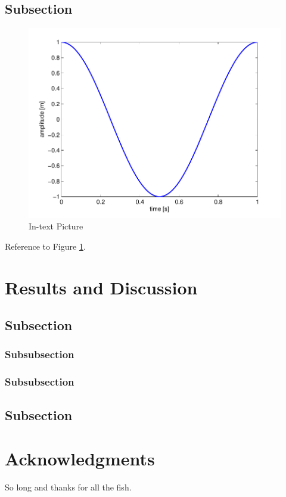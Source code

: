 \documentclass[fleqn,10pt]{wlpeerj}
\begin{document}
\subsection*{Subsection}

\lipsum[9] %

\begin{figure}[ht]\centering
\includegraphics[width=\linewidth]{results}
\caption{In-text Picture}
\label{fig:results}
\end{figure}

Reference to Figure \ref{fig:results}.

\section*{Results and Discussion}

\lipsum[10] %

\subsection*{Subsection}

\lipsum[11] %

\subsubsection*{Subsubsection}

\lipsum[12] %

\subsubsection*{Subsubsection}

\lipsum[14] %

\subsection*{Subsection}

\lipsum[15-20] %

\section*{Acknowledgments}

So long and thanks for all the fish.


\end{document}

